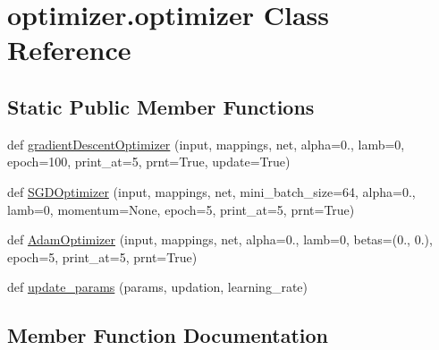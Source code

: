 \hypertarget{classoptimizer_1_1optimizer}{}\section{optimizer.\+optimizer Class Reference}
\label{classoptimizer_1_1optimizer}
\subsection*{Static Public Member Functions}
\begin{DoxyCompactItemize}
\item 
def \mbox{\hyperlink{classoptimizer_1_1optimizer_a14925be33f066a482408567cf9ee440f}{gradient\+Descent\+Optimizer}} (input, mappings, net, alpha=0., lamb=0, epoch=100, print\+\_\+at=5, prnt=True, update=True)
\item 
def \mbox{\hyperlink{classoptimizer_1_1optimizer_a0daa3477ecb2e73e07de11560d197f48}{S\+G\+D\+Optimizer}} (input, mappings, net, mini\+\_\+batch\+\_\+size=64, alpha=0., lamb=0, momentum=None, epoch=5, print\+\_\+at=5, prnt=True)
\item 
def \mbox{\hyperlink{classoptimizer_1_1optimizer_a6dc8176e4d509fcc5f8169e318e04a34}{Adam\+Optimizer}} (input, mappings, net, alpha=0., lamb=0, betas=(0., 0.), epoch=5, print\+\_\+at=5, prnt=True)
\item 
def \mbox{\hyperlink{classoptimizer_1_1optimizer_ae54007767b7637fc2a1bfd0bc0a71934}{update\+\_\+params}} (params, updation, learning\+\_\+rate)
\end{DoxyCompactItemize}


\subsection{Member Function Documentation}
\mbox{\label{classoptimizer_1_1optimizer_a6dc8176e4d509fcc5f8169e318e04a34}} 
